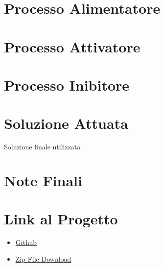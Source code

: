 \documentclass{article}
\begin{document}
\section{Processo Alimentatore}

\section{Processo Attivatore}

\section{Processo Inibitore}


\section{Soluzione Attuata}
Soluzione finale utilizzata

\section{Note Finali}


\section{Link al Progetto}
    \begin{itemize}
        \item \href{https://github.com/filippo-ferrando/progetto-so}{Github}
        \item \href{https://github.com/filippo-ferrando/progetto-so/archive/refs/heads/main.zip}{Zip File Download}
    \end{itemize}
\end{document}
